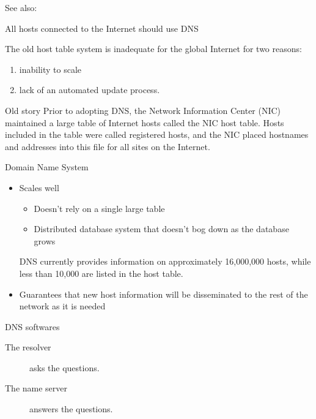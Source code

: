 See also: 

\begin{frame}{All hosts connected to the Internet should use DNS}
  \begin{block}{The old host table system is inadequate for the global Internet for two
      reasons:}
    \begin{enumerate}
    \item inability to scale
    \item lack of an automated update process.
    \end{enumerate}
  \end{block}
  \begin{block}{Old story}
    Prior to adopting DNS, the Network Information Center (NIC) maintained a large table
    of Internet hosts called the NIC host table. Hosts included in the table were called
    registered hosts, and the NIC placed hostnames and addresses into this file for all
    sites on the Internet.
  \end{block}
\end{frame}

\begin{frame}{Domain Name System}
  \begin{itemize}
  \item Scales well
    \begin{itemize}
    \item Doesn't rely on a single large table
    \item Distributed database system that doesn't bog down as the database grows
    \end{itemize}
    DNS currently provides information on approximately 16,000,000 hosts, while less than
    10,000 are listed in the host table.
  \item Guarantees that new host information will be disseminated to the rest of the
    network as it is needed
  \end{itemize}
\end{frame}

\begin{frame}{DNS softwares}
  \begin{center}
     
  \end{center}
  \begin{description}
  \item[The resolver]  asks the questions.
  \item[The name server]  answers the questions.
  \end{description}
\end{frame}


